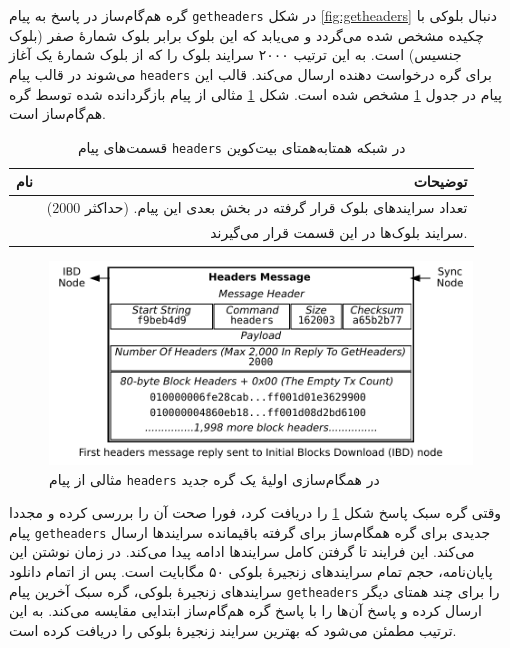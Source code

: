 گره هم‌گام‌ساز در پاسخ به پیام \texttt{getheaders} در شکل \ref{fig:getheaders} دنبال بلوکی با چکیده مشخص شده می‌گردد و می‌یابد که این بلوک برابر بلوک شمارهٔ صفر (بلوک جنسیس) است. به این ترتیب $۲۰۰۰$ سرایند بلوک را که از بلوک شمارهٔ یک آغاز می‌شوند در قالب پیام \texttt{headers} برای گره درخواست دهنده ارسال می‌کند. قالب این پیام در جدول \ref{table:HeadersMessage} مشخص شده‌ است. شکل \ref{fig:headers} مثالی از پیام بازگردانده شده توسط گره هم‌گام‌ساز است.

\begin{table}[!h]
	\centering
	\caption{
		قسمت‌های پیام \texttt{headers} در شبکه همتا‌به‌همتای بیت‌کوین
		\label{table:HeadersMessage}}
	\begin{tabular}{|c|r|}
		\hline
		\textbf{نام} & {\textbf{توضیحات}} \\
		\hline \hline
		
		\lr{count} & {%
			تعداد سرایند‌های بلوک قرار گرفته در بخش بعدی این پیام. (حداکثر $2000$)
		} \\
		\hline
		
		\lr{headers} & {%
			سرایند‌ بلوک‌ها در این قسمت قرار می‌گیرند.
		} \\
		\hline
	\end{tabular}
\end{table}

\begin{figure}[!h]
	\centering
	\includegraphics[width=0.7\linewidth]{image/headers}
	\caption{مثالی از پیام \texttt{headers} در همگام‌سازی اولیهٔ یک گره جدید}
	\label{fig:headers}
\end{figure}

وقتی گره سبک پاسخ شکل \ref{fig:headers} را دریافت کرد، فورا صحت آن را بررسی کرده و مجددا پیام  \texttt{getheaders} جدیدی برای گره همگام‌ساز برای گرفته باقیمانده سرایند‌ها ارسال می‌کند. این فرایند تا گرفتن کامل سرایند‌ها ادامه پیدا می‌کند. در زمان نوشتن این پایان‌نامه، حجم تمام سرایند‌های زنجیرهٔ بلوکی ۵۰ مگابایت است. پس از اتمام دانلود سرایند‌های زنجیرهٔ  بلوکی، گره سبک آخرین پیام \texttt{getheaders} را برای چند همتای دیگر ارسال کرده و پاسخ آن‌ها را با پاسخ گره هم‌گام‌ساز ابتدایی مقایسه می‌کند. به این ترتیب مطمئن می‌شود که بهترین سرایند زنجیرهٔ بلوکی را دریافت کرده است. 

